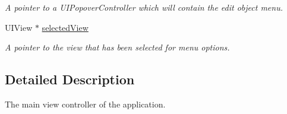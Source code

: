 \begin{DoxyCompactItemize}
\begin{DoxyCompactList}\small\item\em A pointer to a U\-I\-Popover\-Controller which will contain the edit object menu. \end{DoxyCompactList}\item 
\hypertarget{interface_view_controller_a7d349fc947db08dd56690582423a4b1b}{U\-I\-View $\ast$ \hyperlink{interface_view_controller_a7d349fc947db08dd56690582423a4b1b}{selected\-View}}\label{interface_view_controller_a7d349fc947db08dd56690582423a4b1b}

\begin{DoxyCompactList}\small\item\em A pointer to the view that has been selected for menu options. \end{DoxyCompactList}\end{DoxyCompactItemize}


\subsection{Detailed Description}
The main view controller of the application. 

